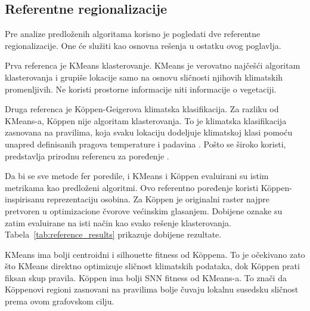 \documentclass[11pt]{article}
\begin{document}
\subsection{Referentne regionalizacije}
Pre analize predloženih algoritama korisno je pogledati dve referentne regionalizacije. One će služiti kao osnovna rešenja u ostatku ovog poglavlja.

Prva referenca je KMeans klasterovanje. KMeans je verovatno najčešći algoritam klasterovanja i grupiše lokacije samo na osnovu sličnosti njihovih klimatskih promenljivih. Ne koristi prostorne informacije niti informacije o vegetaciji.

Druga referenca je Köppen-Geigerova klimatska klasifikacija. Za razliku od KMeans-a, Köppen nije algoritam klasterovanja. To je klimatska klasifikacija zasnovana na pravilima, koja svaku lokaciju dodeljuje klimatskoj klasi pomoću unapred definisanih pragova temperature i padavina \cite{koppen1936,peel2007}. Pošto se široko koristi, predstavlja prirodnu referencu za poređenje \cite{peel2007,beck2018}.

Da bi se sve metode fer poredile, i KMeans i Köppen evaluirani su istim metrikama kao predloženi algoritmi. Ovo referentno poređenje koristi Köppen-inspirisanu reprezentaciju osobina. Za Köppen je originalni raster najpre pretvoren u optimizacione čvorove većinskim glasanjem. Dobijene oznake su zatim evaluirane na isti način kao svako rešenje klasterovanja. Tabela~\ref{tab:reference_results} prikazuje dobijene rezultate.


\begin{table}[ht]
\centering
\caption{Referentne regionalizacije.}
\label{tab:reference_results}
\end{table}

KMeans ima bolji centroidni i silhouette fitness od Köppena. To je očekivano zato što KMeans direktno optimizuje sličnost klimatskih podataka, dok Köppen prati fiksan skup pravila. Köppen ima bolji SNN fitness od KMeans-a. To znači da Köppenovi regioni zasnovani na pravilima bolje čuvaju lokalnu susedsku sličnost prema ovom grafovskom cilju.
\end{document}
